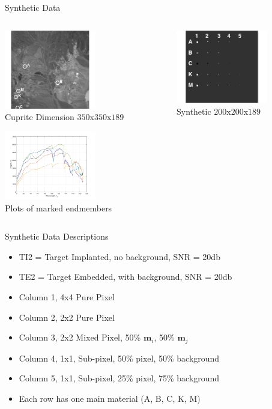 \documentclass{beamer}
\begin{document}
\begin{frame}{Synthetic Data}
\begin{columns}
    \begin{column}{0.5\textwidth}
        \includegraphics[width=4cm,center]{cuprite_groundTruth}
        \centering
        \\ Cuprite Dimension \(350\)x\(350\)x\(189\)

        \includegraphics[width=4cm,center]{reflectance}
        \centering
        \\ Plots of marked endmembers
    \end{column}
    \begin{column}{0.5\textwidth}
        \includegraphics[width=4cm,center]{synthetic_labeled}
        \centering
        \\ Synthetic \(200\)x\(200\)x\(189\)

    \end{column}
\end{columns}
\end{frame}

\begin{frame}{Synthetic Data Descriptions}
        \begin{itemize}
        \item TI2 = Target Implanted, no background, SNR = 20db
        \item TE2 = Target Embedded, with background, SNR = 20db
        \item Column 1, 4x4 Pure Pixel
        \item Column 2, 2x2 Pure Pixel
        \item Column 3, 2x2 Mixed Pixel, 50\% \(\mathbf{m}_i\), 50\% \(\mathbf{m}_j\)
        \item Column 4, 1x1, Sub-pixel, 50\% pixel, 50\% background
        \item Column 5, 1x1, Sub-pixel, 25\% pixel, 75\% background
        \item Each row has one main material (A, B, C, K, M)
        \end{itemize}
\end{frame}
\end{document}
